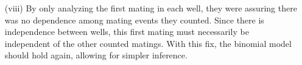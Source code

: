 \documentclass[11pt]{article}
\theoremstyle{definition}
\begin{document}
\begin{itemize}
\begin{itemize}
            \item[(viii)] By only analyzing the first mating in each well, they were assuring there was no dependence among mating events they counted. Since there is independence between wells, this first mating must necessarily be independent of the other counted matings. With this fix, the binomial model should hold again, allowing for simpler inference. 
        \end{itemize}
\end{itemize}
\end{document}
